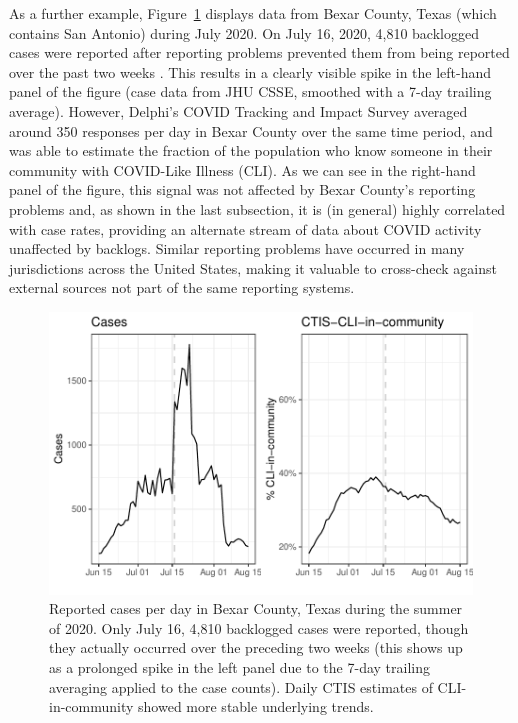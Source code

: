 \documentclass[9pt,twocolumn,twoside,lineno]{pnas-new}
\begin{document}
As a further example, Figure~\ref{fig:bexar-compare} displays data from Bexar
County, Texas (which contains San Antonio) during July 2020. On July 16, 2020,
4,810 backlogged cases were reported after reporting problems prevented them
from being reported over the past two weeks \cite{Palacios:2021}. This results
in a clearly visible spike in the left-hand panel of the figure (case data from
JHU CSSE, smoothed with a 7-day trailing average).  However, Delphi's COVID
Tracking and Impact Survey averaged around 350 responses per day in Bexar
County over the same time period, and was able to estimate the fraction
of the population who know someone in their community with COVID-Like Illness
(CLI). As we can see in the right-hand panel of the figure, this signal was not
affected by Bexar County's reporting problems and, as shown in the last
subsection, it is (in general) highly correlated with case rates, providing an
alternate stream of data about COVID activity unaffected by backlogs. Similar
reporting problems have occurred in many jurisdictions across the United States,
making it valuable to cross-check against external sources not part of the same
reporting systems.

\begin{figure}
  \centering
  \includegraphics[width=\columnwidth]{fig/bexar_compare.pdf}
  \caption{Reported cases per day in Bexar County, Texas during the summer of
    2020. Only July 16, 4,810 backlogged cases were reported, though they
    actually occurred over the preceding two weeks (this shows up as a prolonged
    spike in the left panel due to the 7-day trailing averaging applied to the
    case counts). Daily CTIS estimates of CLI-in-community showed more stable
    underlying trends.}
  \label{fig:bexar-compare}
\end{figure}
\end{document}
